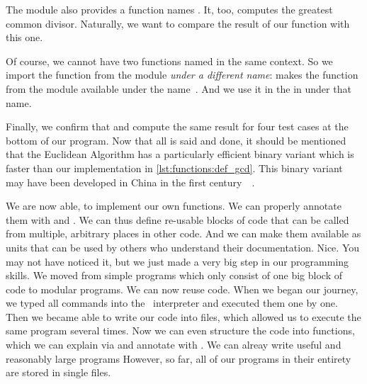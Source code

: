 The  module also provides a function names .
It, too, computes the greatest common divisor.
Naturally, we want to compare the result of our function with this one.
%
\begin{sloppypar}%
Of course, we cannot have two functions named  in the same context.
So we import the function from the  module \emph{under a different name}:
 makes the  function from the module  available under the name~.
And we use it in the  in  under that name.%
\end{sloppypar}%
%
Finally, we confirm that  and  compute the same result for four test cases at the bottom of our program.
Now that all is said and done, it should be mentioned that the Euclidean Algorithm has a particularly efficient binary variant which is faster than our implementation in \cref{lst:functions:def_gcd}.
This binary variant may have been developed in China in the first century~~\cite{B1999FAOTBEA}.

We are now able, to implement our own functions.
We can properly annotate them with  and .
We can thus define re-usable blocks of code that can be called from multiple, arbitrary places in other code.
And we can make them available as units that can be used by others who understand their documentation.
Nice.%
%
\FloatBarrier%
\endhsection%
%
%
\label{sec:functionsInModules}%
%
%
%
%
%
You may not have noticed it, but we just made a very big step in our programming skills.
We moved from simple programs which only consist of one big block of code to modular programs.
We can now reuse code.
When we began our journey, we typed all commands into the \python\ interpreter and executed them one by one.
Then we became able to write our code into files, which allowed us to execute the same program several times.
Now we can even structure the code into functions, which we can explain via  and annotate with .
We can alreay write useful and reasonably large programs
However, so far, all of our programs in their entirety are stored in single files.

